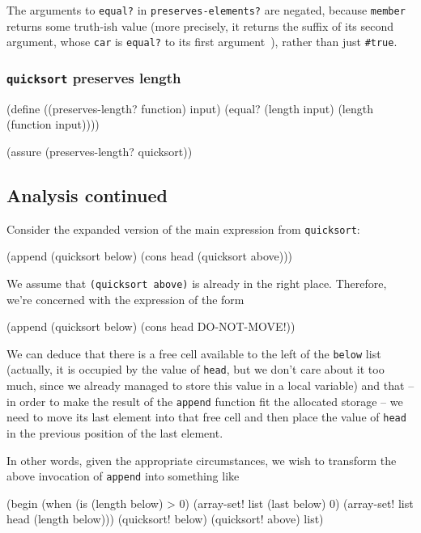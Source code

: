 The arguments to \texttt{equal?} in \texttt{preserves-elements?}
are negated, because \texttt{member} returns some truth-ish value
(more precisely, it returns the suffix of its second argument,
whose \texttt{car} is \texttt{equal?} to its first argument~\cite{R5RS}),
rather than just \texttt{\#true}.

\subsubsection{\texttt{quicksort} preserves length}

\begin{Snippet}
(define ((preserves-length? function) input)
  (equal? (length input) (length (function input))))

(assure (preserves-length? quicksort))
\end{Snippet}

\subsection{Analysis continued}

Consider the expanded version of the main expression from \texttt{quicksort}:

\begin{Snippet}
(append (quicksort below) (cons head (quicksort above)))
\end{Snippet}

We assume that \texttt{(quicksort above)} is already in the right place.
Therefore, we're concerned with the expression of the form

\begin{Snippet}
(append (quicksort below) (cons head DO-NOT-MOVE!))
\end{Snippet}

We can deduce that there is a free cell available to the left of
the \texttt{below} list (actually, it is occupied by the value of
\texttt{head}, but we don't care about it too much, since we already
managed to store this value in a local variable) and that -- in order
to make the result of the \texttt{append} function fit the allocated
storage -- we need to move its last element into that free cell
and then place the value of \texttt{head} in the previous position
of the last element.

In other words, given the appropriate circumstances, we wish
to transform the above invocation of \texttt{append} into something like

\begin{Snippet}
(begin
  (when (is (length below) > 0)
    (array-set! list (last below) 0)
    (array-set! list head (length below)))
  (quicksort! below)
  (quicksort! above)
  list)
\end{Snippet}

